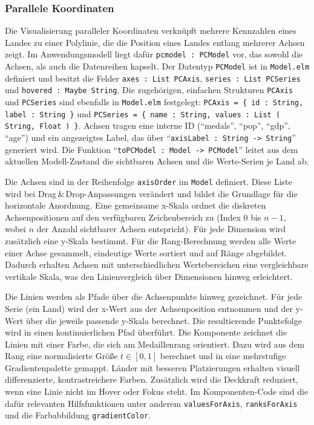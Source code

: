 \subsubsection{Parallele Koordinaten}

Die Visualisierung paralleler Koordinaten verknüpft mehrere Kennzahlen eines Landes zu einer Polylinie, die die Position eines Landes entlang mehrerer Achsen zeigt. Im Anwendungsmodell liegt dafür \texttt{pcmodel : PCModel} vor, das sowohl die Achsen, als auch die Datenreihen kapselt. Der Datentyp \texttt{PCModel} ist in \texttt{Model.elm} definiert und besitzt die Felder \texttt{axes : List PCAxis}, \texttt{series : List PCSeries} und \texttt{hovered : Maybe String}. Die zugehörigen, einfachen Strukturen \texttt{PCAxis} und \texttt{PCSeries} sind ebenfalls in \texttt{Model.elm} festgelegt: \texttt{PCAxis = \{ id : String, label : String \}} und \texttt{PCSeries = \{ name : String, values : List ( String, Float ) \}}. Achsen tragen eine interne ID (\enquote{medals}, \enquote{pop}, \enquote{gdp}, \enquote{age}) und ein angezeigtes Label, das über \enquote{\texttt{axisLabel : String -> String}} generiert wird. Die Funktion \enquote{\texttt{toPCModel : Model -> PCModel}} leitet aus dem aktuellen Modell-Zustand die sichtbaren Achsen und die Werte-Serien je Land ab.

Die Achsen sind in der Reihenfolge \texttt{axisOrder} im \texttt{Model} definiert. Diese Liste wird bei Drag\,\&\,Drop-Anpassungen verändert und bildet die Grundlage für die horizontale Anordnung. Eine gemeinsame x-Skala ordnet die diskreten Achsenpositionen auf den verfügbaren Zeichenbereich zu (Index 0 bis \(n-1\), wobei \(n\) der Anzahl sichtbarer Achsen entspricht). Für jede Dimension wird zusätzlich eine y-Skala bestimmt. Für die Rang-Berechnung werden alle Werte einer Achse gesammelt, eindeutige Werte sortiert und auf Ränge abgebildet. Dadurch erhalten Achsen mit unterschiedlichen Wertebereichen eine vergleichbare vertikale Skala, was den Linienvergleich über Dimensionen hinweg erleichtert.

Die Linien werden als Pfade über die Achsenpunkte hinweg gezeichnet. Für jede Serie (ein Land) wird der x-Wert aus der Achsenposition entnommen und der y-Wert über die jeweils passende y-Skala berechnet. Die resultierende Punktefolge wird in einen kontinuierlichen Pfad überführt. Die Komponente zeichnet die Linien mit einer Farbe, die sich am Medaillenrang orientiert. Dazu wird aus dem Rang eine normalisierte Größe \(t\in[0,1]\) berechnet und in eine mehrstufige Gradientenpalette gemappt. Länder mit besseren Platzierungen erhalten visuell differenzierte, kontrastreichere Farben. Zusätzlich wird die Deckkraft reduziert, wenn eine Linie nicht im Hover oder Fokus steht. Im Komponenten-Code sind die dafür relevanten Hilfsfunktionen unter anderem \texttt{valuesForAxis}, \texttt{ranksForAxis} und die Farbabbildung \texttt{gradientColor}.

